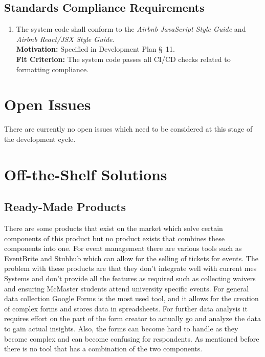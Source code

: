 \documentclass[12pt]{article}
\begin{document}
\subsection{Standards Compliance Requirements}
\begin{enumerate}[align=left,
  leftmargin=*,
  labelsep=1em,
  itemindent=0em,
  label=\bfseries ST-\arabic*:]
  \item \label{CSCR1} The system code shall conform to the \textit{Airbnb JavaScript Style Guide} and \textit{Airbnb React/JSX
    Style Guide}.\\[2mm]
    {\bf Motivation:} Specified in Development Plan \S \ 11.\\
    {\bf Fit Criterion:} The system code passes all CI/CD checks related to formatting compliance.\\
\end{enumerate}

\section{Open Issues}
There are currently no open issues which need to be considered at this stage of the development cycle.
\section{Off-the-Shelf Solutions}
\subsection{Ready-Made Products}
There are some products that exist on the market which solve certain components of this product but no product exists
that combines these components into one. For event management there are various tools such as EventBrite and Stubhub
which can allow for the selling of tickets for events. The problem with these products are that they don't integrate
well with current \gls{mes} Systems and don't provide all the features as required such as collecting waivers and
ensuring McMaster students attend university specific events. For general data collection Google Forms is the most used
tool, and it allows for the creation of complex forms and stores data in spreadsheets. For further data analysis it
requires effort on the part of the form creator to actually go and analyze the data to gain actual insights. Also, the
forms can become hard to handle as they become complex and can become confusing for respondents. As mentioned before
there is no tool that has a combination of the two components.
\end{document}
